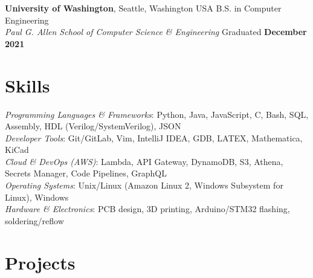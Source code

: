 \documentclass[margin,line]{res}
\newenvironment{list1}{
  \begin{list}{\ding{113}}{%
      \setlength{\itemsep}{0in}
      \setlength{\parsep}{0in} \setlength{\parskip}{0in}
      \setlength{\topsep}{0in} \setlength{\partopsep}{0in} 
      \setlength{\leftmargin}{0.2in}} \raggedright}{\end{list}}
\begin{document}
\begin{resume}
{\bf University of Washington}, Seattle, Washington USA \hfill B.S. in Computer Engineering \\
{\em Paul G. Allen School of Computer Science \& Engineering} \hfill Graduated {\bf December 2021} 




\section{\sc Skills} %
  {\em Programming Languages \& Frameworks}:  
  Python, Java, JavaScript, C, Bash, SQL, Assembly, HDL (Verilog/SystemVerilog), JSON  
  \\
  {\em Developer Tools}:  
  Git/GitLab, Vim, IntelliJ IDEA, GDB, LATEX, Mathematica, KiCad  
  \\
  {\em Cloud \& DevOps (AWS)}:  
  Lambda, API Gateway, DynamoDB, S3, Athena, Secrets Manager, Code Pipelines, GraphQL  
  \\
  {\em Operating Systems}:  
  Unix/Linux (Amazon Linux 2, Windows Subsystem for Linux), Windows  
  \\
  {\em Hardware \& Electronics}:  
  PCB design, 3D printing, Arduino/STM32 flashing, soldering/reflow

\section{\sc Projects }


\end{resume}
\end{document}
